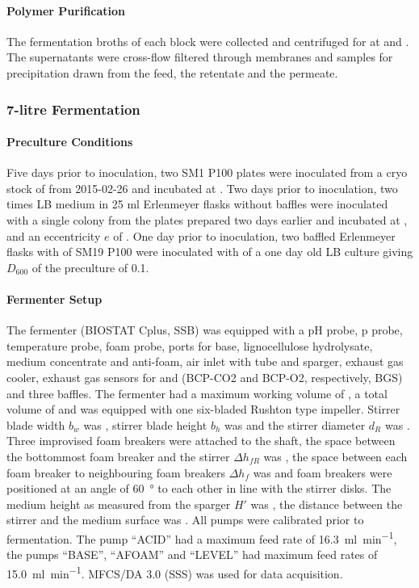 \paragraph{Polymer Purification\label{par-met-mibi-ferm-dasgip-puri}}
The fermentation broths of each block were collected and centrifuged for  at  and . The supernatants were cross-flow filtered through  membranes and samples for precipitation drawn from the feed, the retentate and the permeate.

\subsubsection{7-litre Fermentation\label{subsubsec-met-mibi-ferm-10l}}
\paragraph{Preculture Conditions}
Five days prior to inoculation, two SM1 P100 plates were inoculated from a cryo stock of \strain{} from 2015-02-26 and incubated at . Two days prior to inoculation, two times  LB medium in 25 ml Erlenmeyer flasks without baffles were inoculated with a single colony from the plates prepared two days earlier and incubated at ,  and an eccentricity $e$ of . One day prior to inoculation, two baffled Erlenmeyer flasks with  of SM19 P100 were inoculated with  of a one day old LB culture giving $D_{600}$ of the preculture of \num{0.1}.

\paragraph{Fermenter Setup}
The fermenter (BIOSTAT Cplus, SSB) was equipped with a pH probe, p probe, temperature probe, foam probe, ports for base, lignocellulose hydrolysate, medium concentrate and anti-foam, air inlet with tube and sparger, exhaust gas cooler, exhaust gas sensors for  and  (BCP-CO2 and BCP-O2, respectively, BGS) and three baffles. The fermenter had a maximum working volume of , a total volume of  and was equipped with one six-bladed Rushton type impeller. Stirrer blade width $b_w$ was , stirrer blade height $b_h$ was  and the stirrer diameter $d_R$ was . Three improvised foam breakers were attached to the shaft, the space between the bottommost foam breaker and the stirrer $\Delta{}h_{fR}$ was , the space between each foam breaker to neighbouring foam breakers $\Delta{}h_f$ was  and foam breakers were positioned at an angle of \SI{60}{\degree} to each other in line with the stirrer disks. The medium height as measured from the sparger $H'$ was , the distance between the stirrer and the medium surface was . All pumps were calibrated prior to fermentation. The pump \enquote{ACID} had a maximum feed rate of \SI{16.3}{\milli\litre\per\minute}, the pumps \enquote{BASE}, \enquote{AFOAM} and \enquote{LEVEL} had maximum feed rates of \SI{15.0}{\milli\litre\per\minute}. MFCS/DA 3.0 (SSS) was used for data acquisition.

